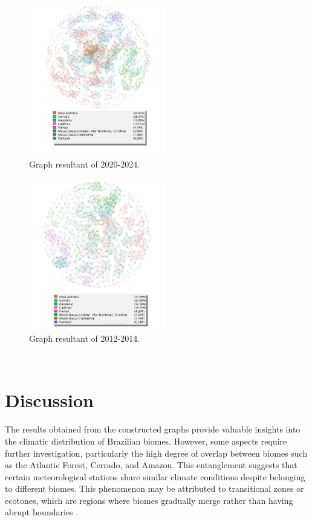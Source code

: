 \documentclass[conference]{IEEEtran}
\begin{document}
\begin{figure}[ht]
  \includegraphics[width=0.53\textwidth]{imgs/20202024F.jpg}
  \caption{Graph resultant of 2020-2024.}
  \label{fig:example}
\end{figure}

\clearpage

\begin{figure}[ht]
  \centering
  \includegraphics[width=0.53\textwidth]{imgs/20122014F.jpg}
  \caption{Graph resultant of 2012-2014.}
  \label{fig:g2}
\end{figure}

\


\section{Discussion}

The results obtained from the constructed graphs provide valuable insights into the climatic distribution of Brazilian biomes. However, some aspects require further investigation, particularly the high degree of overlap between biomes such as the Atlantic Forest, Cerrado, and Amazon. This entanglement suggests that certain meteorological stations share similar climate conditions despite belonging to different biomes. This phenomenon may be attributed to transitional zones or ecotones, which are regions where biomes gradually merge rather than having abrupt boundaries \cite{olson2001terrestrial}.
\end{document}
